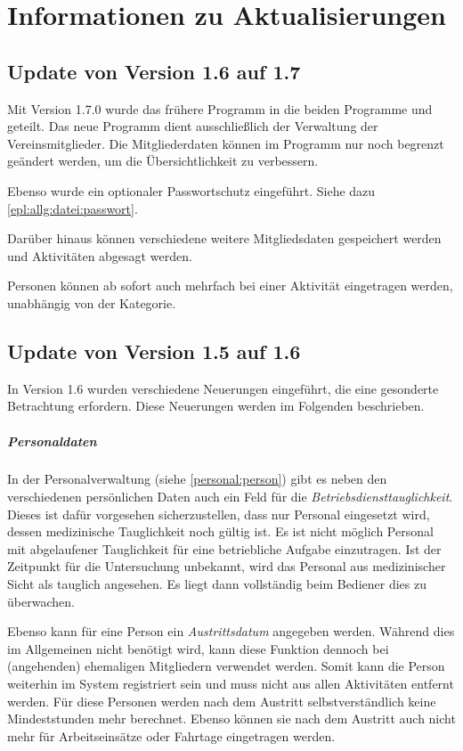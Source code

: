 \chapter{Informationen zu Aktualisierungen}\label{epl:update}
\section{Update von Version 1.6 auf 1.7}
\label{epl:update:1.6-1.7}
Mit Version 1.7.0 wurde das frühere Programm \Einsatz in die beiden Programme \Einsatz und \Personal geteilt.
Das neue Programm \Personal dient ausschließlich der Verwaltung der Vereinsmitglieder.
Die Mitgliederdaten können im Programm \Einsatz nur noch begrenzt geändert werden, um die Übersichtlichkeit zu verbessern.

Ebenso wurde ein optionaler Passwortschutz eingeführt.
Siehe dazu \cref{epl:allg:datei:passwort}.

Darüber hinaus können verschiedene weitere Mitgliedsdaten gespeichert werden und Aktivitäten abgesagt werden.

Personen können ab sofort auch mehrfach bei einer Aktivität eingetragen werden,
unabhängig von der Kategorie.

\section{Update von Version 1.5 auf 1.6}
\label{epl:update:1.5-1.6}
In Version 1.6 wurden verschiedene Neuerungen eingeführt, die eine gesonderte Betrachtung erfordern.
Diese Neuerungen werden im Folgenden beschrieben.


\paragraph{Personaldaten}
In der Personalverwaltung (siehe \cref{personal:person}) gibt es neben den verschiedenen persönlichen Daten auch ein Feld für die \emph{Betriebsdiensttauglichkeit}.
Dieses ist dafür vorgesehen sicherzustellen, dass nur Personal eingesetzt wird, dessen medizinische Tauglichkeit noch gültig ist.
Es ist nicht möglich Personal mit abgelaufener Tauglichkeit für eine betriebliche Aufgabe einzutragen.
Ist der Zeitpunkt für die Untersuchung unbekannt, wird das Personal aus medizinischer Sicht als tauglich angesehen.
Es liegt dann vollständig beim Bediener dies zu überwachen.

Ebenso kann für eine Person ein \emph{Austrittsdatum} angegeben werden.
Während dies im Allgemeinen nicht benötigt wird, kann diese Funktion dennoch bei (angehenden) ehemaligen Mitgliedern verwendet werden.
Somit kann die Person weiterhin im System registriert sein und muss nicht aus allen Aktivitäten entfernt werden.
Für diese Personen werden nach dem Austritt selbstverständlich keine Mindeststunden mehr berechnet.
Ebenso können sie nach dem Austritt auch nicht mehr für Arbeitseinsätze oder Fahrtage eingetragen werden.

